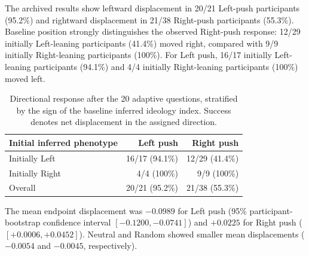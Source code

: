 The archived results show leftward displacement in 20/21
Left-push participants (95.2\%) and rightward displacement in
21/38 Right-push participants (55.3\%). Baseline position
strongly distinguishes the observed Right-push response:
12/29 initially Left-leaning participants (41.4\%) moved right,
compared with 9/9 initially Right-leaning participants (100\%).
For Left push, 16/17 initially Left-leaning participants
(94.1\%) and 4/4 initially Right-leaning participants (100\%)
moved left.

\begin{table}[!t]
\centering
\caption{Directional response after the 20 adaptive questions,
stratified by the sign of the baseline inferred ideology index.
Success denotes net displacement in the assigned direction.}
\label{tab:humanstudy-new-stratified}
\small
\setlength{\tabcolsep}{8pt}
\begin{tabular}{lrr}
\toprule
Initial inferred phenotype & Left push & Right push\\
\midrule
Initially Left & 16/17 (94.1\%) & 12/29 (41.4\%)\\
Initially Right & 4/4 (100\%) & 9/9 (100\%)\\
\midrule
Overall & 20/21 (95.2\%) & 21/38 (55.3\%)\\
\bottomrule
\end{tabular}
\end{table}


The mean endpoint displacement was $-0.0989$ for Left push
(95\% participant-bootstrap confidence interval
$[-0.1200,-0.0741]$) and $+0.0225$ for Right push
($[+0.0006,+0.0452]$). Neutral and Random showed smaller mean
displacements ($-0.0054$ and $-0.0045$, respectively).


